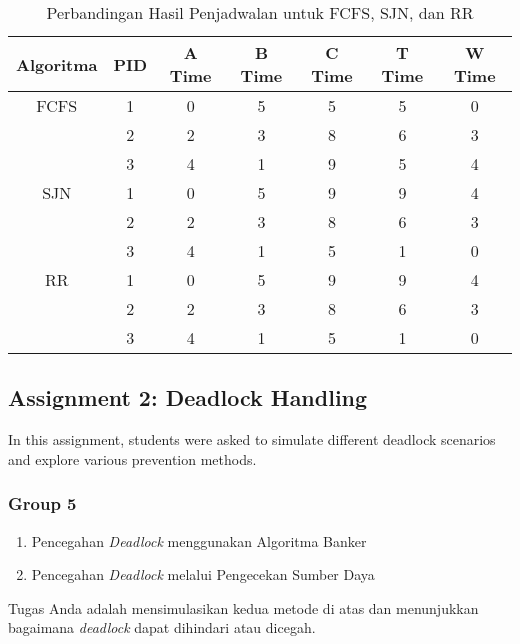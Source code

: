 \documentclass[12pt]{article}
\begin{document}
\begin{table}[htbp]
    \centering
    \begin{tabular}{|c|c|c|c|c|c|c|}
        \hline
        Algoritma & PID & A Time & B Time & C Time & T Time & W Time \\
        \hline
        FCFS      & 1   & 0            & 5          & 5               & 5               & 0            \\
                  & 2   & 2            & 3          & 8               & 6               & 3            \\
                  & 3   & 4            & 1          & 9               & 5               & 4            \\
        \hline
        SJN       & 1   & 0            & 5          & 9               & 9               & 4            \\
                  & 2   & 2            & 3          & 8               & 6               & 3            \\
                  & 3   & 4            & 1          & 5               & 1               & 0            \\
        \hline
        RR        & 1   & 0            & 5          & 9               & 9               & 4            \\
                  & 2   & 2            & 3          & 8               & 6               & 3            \\
                  & 3   & 4            & 1          & 5               & 1               & 0            \\
        \hline
    \end{tabular}
    \caption{Perbandingan Hasil Penjadwalan untuk FCFS, SJN, dan RR}
    \label{tab:hasil_perbandingan}
\end{table}

\subsection{Assignment 2: Deadlock Handling}
In this assignment, students were asked to simulate different deadlock scenarios and explore various prevention methods.

\subsubsection{Group 5}

\begin{enumerate}
    \item Pencegahan \textit{Deadlock} menggunakan Algoritma Banker
    \item Pencegahan \textit{Deadlock} melalui Pengecekan Sumber Daya
\end{enumerate}
Tugas Anda adalah mensimulasikan kedua metode di atas dan menunjukkan bagaimana \textit{deadlock} dapat dihindari atau dicegah.
\end{document}
